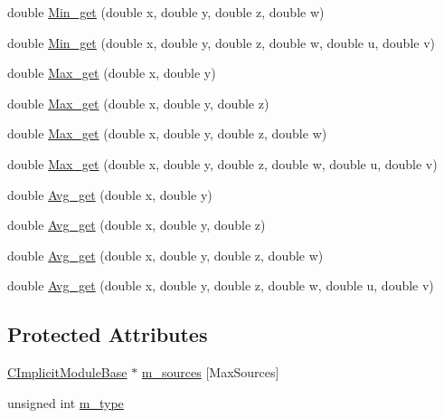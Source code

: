 \begin{DoxyCompactItemize}
\item 
double \hyperlink{classanl_1_1CImplicitCombiner_a4796d3cf8aab8f5f971f28cb6be04dd5}{Min\_\-get} (double x, double y, double z, double w)
\item 
double \hyperlink{classanl_1_1CImplicitCombiner_ab0b63b368fb0a49efcd2fd82d511027c}{Min\_\-get} (double x, double y, double z, double w, double u, double v)
\item 
double \hyperlink{classanl_1_1CImplicitCombiner_a69c8e91aab65ea2354d303a0220c578b}{Max\_\-get} (double x, double y)
\item 
double \hyperlink{classanl_1_1CImplicitCombiner_a8ca2a27551a58f35e6acde35904c4958}{Max\_\-get} (double x, double y, double z)
\item 
double \hyperlink{classanl_1_1CImplicitCombiner_a83a1dd92d435423e267b7d1386c51385}{Max\_\-get} (double x, double y, double z, double w)
\item 
double \hyperlink{classanl_1_1CImplicitCombiner_a3dc2936c2226a6d04f7841e6f9da5a09}{Max\_\-get} (double x, double y, double z, double w, double u, double v)
\item 
double \hyperlink{classanl_1_1CImplicitCombiner_aba0c7d2cc2df41bbf7a9b173309380f6}{Avg\_\-get} (double x, double y)
\item 
double \hyperlink{classanl_1_1CImplicitCombiner_ab9d81b3b9aac42b11bbb9cef2f261fbe}{Avg\_\-get} (double x, double y, double z)
\item 
double \hyperlink{classanl_1_1CImplicitCombiner_a88bc1433df280b7a098ee704ce71a60d}{Avg\_\-get} (double x, double y, double z, double w)
\item 
double \hyperlink{classanl_1_1CImplicitCombiner_abb7287cce930c621637e2b2302b391d8}{Avg\_\-get} (double x, double y, double z, double w, double u, double v)
\end{DoxyCompactItemize}
\subsection*{Protected Attributes}
\begin{DoxyCompactItemize}
\item 
\hyperlink{classanl_1_1CImplicitModuleBase}{CImplicitModuleBase} $\ast$ \hyperlink{classanl_1_1CImplicitCombiner_a133d11b6df60ebfbdcdbac9f8e326b90}{m\_\-sources} \mbox{[}MaxSources\mbox{]}
\item 
unsigned int \hyperlink{classanl_1_1CImplicitCombiner_afd67ca429853294cc7923d782a467d2a}{m\_\-type}
\end{DoxyCompactItemize}


